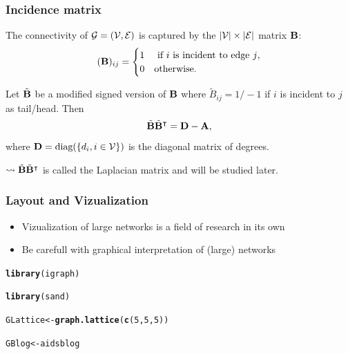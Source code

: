 \documentclass{beamer}\usepackage[]{graphicx}\usepackage[]{color}
\makeatletter
\newcommand{\hlnum}[1]{\textcolor[rgb]{0.686,0.059,0.569}{#1}}%
\newcommand{\hlstd}[1]{\textcolor[rgb]{0.345,0.345,0.345}{#1}}%
\newcommand{\hlkwb}[1]{\textcolor[rgb]{0.69,0.353,0.396}{#1}}%
\newcommand{\hlkwd}[1]{\textcolor[rgb]{0.737,0.353,0.396}{\textbf{#1}}}%
\newenvironment{kframe}{%
 \def\at@end@of@kframe{}%
 \ifinner\ifhmode%
  \def\at@end@of@kframe{\end{minipage}}%
  \begin{minipage}{\columnwidth}%
 \fi\fi%
 \def\FrameCommand##1{\hskip\@totalleftmargin \hskip-\fboxsep
 \colorbox{shadecolor}{##1}\hskip-\fboxsep
     \hskip-\linewidth \hskip-\@totalleftmargin \hskip\columnwidth}%
 \MakeFramed {\advance\hsize-\width
   \@totalleftmargin\z@ \linewidth\hsize
   \@setminipage}}%
 {\par\unskip\endMakeFramed%
 \at@end@of@kframe}
\newenvironment{knitrout}{}{} %
\makeatother
\begin{document}
\begin{frame}
  \frametitle{Incidence matrix}

  \begin{definition}
    The connectivity of $\mathcal{G} = (\mathcal{V},\mathcal{E})$ is captured by the $|\mathcal{V}|\times |\mathcal{E}|$ matrix $\mathbf{B}$:
    \[
      (\mathbf{B})_{ij} = \begin{cases}
      1  & \text{ if $i$ is incident to edge $j$},\\
      0  & \text{otherwise}.
      \end{cases}
    \]
  \end{definition}

  \begin{proposition}[Relationship]
    Let $\tilde{\mathbf{B}}$ be a modified \alert{signed} version of $\mathbf{B}$ where $\tilde{\! B}_{ij}= 1/-1$ if $i$ is incident to $j$ as tail/head. Then
    \[
      \tilde {\mathbf{B}} \tilde {\mathbf{B}}^\intercal = \mathbf{D} - \mathbf{A},
    \]
    where $\mathbf{D} = \text{diag}(\left\{d_i, i\in\mathcal{V}\right\})$ is the diagonal matrix of degrees. 
  \end{proposition}

  $\rightsquigarrow \tilde {\mathbf{B}} \tilde {\mathbf{B}}^\intercal $ is called the Laplacian matrix and will be studied later.

\end{frame}


\begin{frame}
  \frametitle{Layout and Vizualization}
  
  \begin{itemize}
    \item Vizualization of large networks is a field of research in its own
    \item Be carefull with graphical interpretation of (large) networks
  \end{itemize}

\begin{knitrout}\scriptsize
{}\color{fgcolor}\begin{kframe}
\begin{alltt}
\hlkwd{library}\hlstd{(igraph)}

\hlkwd{library}\hlstd{(sand)}

\hlstd{GLattice} \hlkwb{<-} \hlkwd{graph.lattice}\hlstd{(}\hlkwd{c}\hlstd{(}\hlnum{5}\hlstd{,}\hlnum{5}\hlstd{,}\hlnum{5}\hlstd{))}

\hlstd{GBlog}    \hlkwb{<-} \hlstd{aidsblog}
\end{alltt}
\end{kframe}
\end{knitrout}
  
\end{frame}
\end{document}
